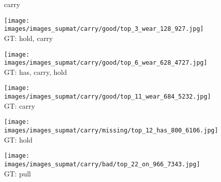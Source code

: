 \documentclass[10pt,twocolumn,letterpaper]{article}
\begin{document}
\begin{figure*}[t]
	\begin{minipage}[t]{0.005\textwidth}
    	\centering
    	\vspace{-9ex}
    	\begin{turn}{90}
    	carry
    	\end{turn}
    	\vspace{2ex}
    \end{minipage}
    \hspace{0.01\textwidth}
	\begin{minipage}[t]{0.18\textwidth}
    	\centering
       	\texttt{[image: images/images\_supmat/carry/good/top\_3\_wear\_128\_927.jpg]}\\
       	\vspace{0.3ex}
       	GT: hold, carry
       	\vspace{2ex}
    \end{minipage}
    \hspace{0.005\textwidth}
    \begin{minipage}[t]{0.18\textwidth}
    	\centering
       	\texttt{[image: images/images\_supmat/carry/good/top\_6\_wear\_628\_4727.jpg]}\\
       	\vspace{0.3ex}
       	GT: has, carry, hold
       	\vspace{0.2ex}
    \end{minipage}
    \hspace{0.005\textwidth}
	\begin{minipage}[t]{0.18\textwidth}
    	\centering
       	\texttt{[image: images/images\_supmat/carry/good/top\_11\_wear\_684\_5232.jpg]}\\
       	\vspace{0.3ex}
       	GT: carry
       	\vspace{0.2ex}
    \end{minipage}
    \hspace{0.005\textwidth}
    \begin{minipage}[t]{0.18\textwidth}
    	\centering
       	\texttt{[image: images/images\_supmat/carry/missing/top\_12\_has\_800\_6106.jpg]}\\
       	\vspace{0.3ex}
       	GT: hold
       	\vspace{0.2ex}
   	\end{minipage}
    \hspace{0.005\textwidth}
    \begin{minipage}[t]{0.18\textwidth}
    	\centering
       	\texttt{[image: images/images\_supmat/carry/bad/top\_22\_on\_966\_7343.jpg]}\\
       	\vspace{0.3ex}
       	GT: pull
       	\vspace{0.2ex}
    \end{minipage}   
  

\end{figure*}
\end{document}
